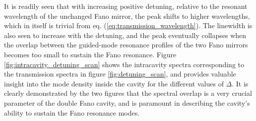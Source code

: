 It is readily seen that with increasing positive detuning, relative to the resonant wavelength of the unchanged Fano mirror, the peak shifts to higher wavelengths, which in itself is trivial from eq. (\ref{eq:transmission_wavelength}). The linewidth is also seen to increase with the detuning, and the peak eventually collapses when the overlap between the guided-mode resonance profiles of the two Fano mirrors becomes too small to sustain the Fano resonance. Figure \ref{fig:intracavity_detuning_scan} shows the intracavity spectra corresponding to the transmission spectra in figure \ref{fig:detuning_scan}, and provides valuable insight into the mode density inside the cavity for the different values of $\Delta$. It is clearly demonstrated by the two figures that the spectral overlap is a very crucial parameter of the double Fano cavity, and is paramount in describing the cavity's ability to sustain the Fano resonance modes. 

